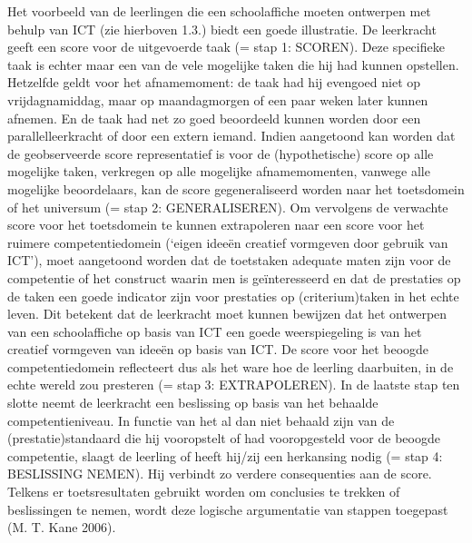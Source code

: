 \documentclass[
  letterpaper,
]{report}
\begin{document}
Het voorbeeld van de leerlingen die een schoolaffiche moeten ontwerpen
met behulp van ICT (zie hierboven 1.3.) biedt een goede illustratie. De
leerkracht geeft een score voor de uitgevoerde taak (= stap 1: SCOREN).
Deze specifieke taak is echter maar een van de vele mogelijke taken die
hij had kunnen opstellen. Hetzelfde geldt voor het afnamemoment: de taak
had hij evengoed niet op vrijdagnamiddag, maar op maandagmorgen of een
paar weken later kunnen afnemen. En de taak had net zo goed beoordeeld
kunnen worden door een parallelleerkracht of door een extern iemand.
Indien aangetoond kan worden dat de geobserveerde score representatief
is voor de (hypothetische) score op alle mogelijke taken, verkregen op
alle mogelijke afnamemomenten, vanwege alle mogelijke beoordelaars, kan
de score gegeneraliseerd worden naar het toetsdomein of het universum (=
stap 2: GENERALISEREN). Om vervolgens de verwachte score voor het
toetsdomein te kunnen extrapoleren naar een score voor het ruimere
competentiedomein (`eigen ideeën creatief vormgeven door gebruik van
ICT'), moet aangetoond worden dat de toetstaken adequate maten zijn voor
de competentie of het construct waarin men is geïnteresseerd en dat de
prestaties op de taken een goede indicator zijn voor prestaties op
(criterium)taken in het echte leven. Dit betekent dat de leerkracht moet
kunnen bewijzen dat het ontwerpen van een schoolaffiche op basis van ICT
een goede weerspiegeling is van het creatief vormgeven van ideeën op
basis van ICT. De score voor het beoogde competentiedomein reflecteert
dus als het ware hoe de leerling daarbuiten, in de echte wereld zou
presteren (= stap 3: EXTRAPOLEREN). In de laatste stap ten slotte neemt
de leerkracht een beslissing op basis van het behaalde
competentieniveau. In functie van het al dan niet behaald zijn van de
(prestatie)standaard die hij vooropstelt of had vooropgesteld voor de
beoogde competentie, slaagt de leerling of heeft hij/zij een herkansing
nodig (= stap 4: BESLISSING NEMEN). Hij verbindt zo verdere
consequenties aan de score. Telkens er toetsresultaten gebruikt worden
om conclusies te trekken of beslissingen te nemen, wordt deze logische
argumentatie van stappen toegepast (M. T. Kane 2006).
\end{document}
